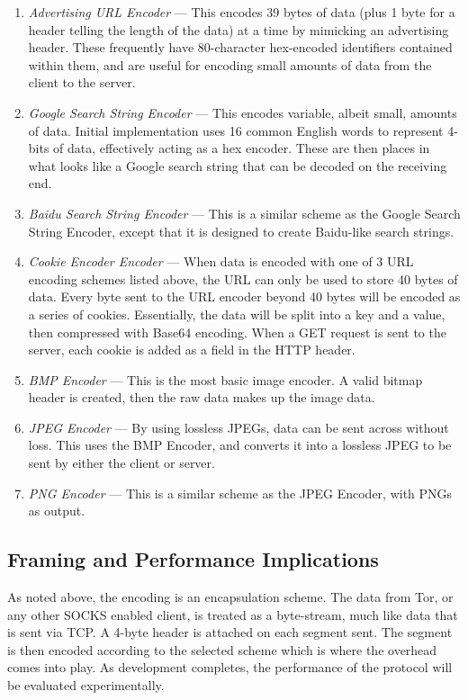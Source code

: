 \begin{enumerate}
  \item \emph{Advertising URL Encoder} --- This encodes 39 bytes of data (plus 1 byte for a header telling the length of the data) at a time by mimicking an advertising header. These frequently have 80-character hex-encoded identifiers contained within them, and are useful for encoding small amounts of data from the client to the server.
  \item \emph{Google Search String Encoder} --- This encodes variable, albeit small, amounts of data. Initial implementation uses 16 common English words to represent 4-bits of data, effectively acting as a hex encoder. These are then places in what looks like a Google search string that can be decoded on the receiving end.
  \item \emph{Baidu Search String Encoder} --- This is a similar scheme as the Google Search String Encoder, except that it is designed to create Baidu-like search strings.
  \item \emph{Cookie Encoder Encoder} --- When data is encoded with one of 3 URL encoding schemes listed above, the URL can only be used to store 40 bytes of data. Every byte sent to the URL encoder beyond 40 bytes will be encoded as a series of cookies. Essentially, the data will be split into a key and a value, then compressed with Base64 encoding. When a GET request is sent to the server, each cookie is added as a field in the HTTP header.
  \item \emph{BMP Encoder} --- This is the most basic image encoder. A valid bitmap header is created, then the raw data makes up the image data.
  \item \emph{JPEG Encoder} --- By using lossless JPEGs, data can be sent across without loss. This uses the BMP Encoder, and converts it into a lossless JPEG to be sent by either the client or server.
  \item \emph{PNG Encoder} --- This is a similar scheme as the JPEG Encoder, with PNGs as output.
\end{enumerate}

\subsection{Framing and Performance Implications}
As noted above, the encoding is an encapsulation scheme. The data from Tor, or any other SOCKS enabled client, is treated as a byte-stream, much like data that is sent via TCP. A 4-byte header is attached on each segment sent. The segment is then encoded according to the selected scheme which is where the overhead comes into play. As development completes, the performance of the protocol will be evaluated experimentally.






